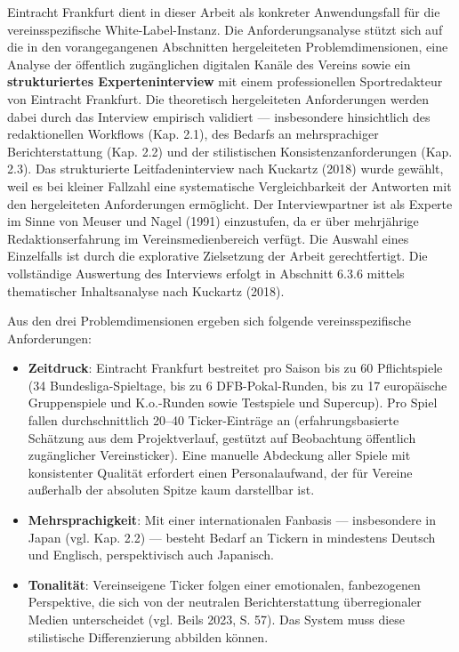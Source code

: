 Eintracht Frankfurt dient in dieser Arbeit als konkreter Anwendungsfall
für die vereinsspezifische White-Label-Instanz. Die Anforderungsanalyse
stützt sich auf die in den vorangegangenen Abschnitten hergeleiteten
Problemdimensionen, eine Analyse der öffentlich zugänglichen digitalen
Kanäle des Vereins sowie ein \textbf{strukturiertes Experteninterview}
mit einem professionellen Sportredakteur von Eintracht Frankfurt. Die
theoretisch hergeleiteten Anforderungen werden dabei durch das Interview
empirisch validiert --- insbesondere hinsichtlich des redaktionellen
Workflows (Kap. 2.1), des Bedarfs an mehrsprachiger Berichterstattung
(Kap. 2.2) und der stilistischen Konsistenzanforderungen (Kap. 2.3). Das
strukturierte Leitfadeninterview nach Kuckartz (2018) wurde gewählt,
weil es bei kleiner Fallzahl eine systematische Vergleichbarkeit der
Antworten mit den hergeleiteten Anforderungen ermöglicht. Der
Interviewpartner ist als Experte im Sinne von Meuser und Nagel (1991)
einzustufen, da er über mehrjährige Redaktionserfahrung im
Vereinsmedienbereich verfügt. Die Auswahl eines Einzelfalls ist durch
die explorative Zielsetzung der Arbeit gerechtfertigt. Die vollständige
Auswertung des Interviews erfolgt in Abschnitt 6.3.6 mittels
thematischer Inhaltsanalyse nach Kuckartz (2018).

Aus den drei Problemdimensionen ergeben sich folgende vereinsspezifische
Anforderungen:

\begin{itemize}
\tightlist
\item
  \textbf{Zeitdruck}: Eintracht Frankfurt bestreitet pro Saison bis zu
  60 Pflichtspiele (34 Bundesliga-Spieltage, bis zu 6 DFB-Pokal-Runden,
  bis zu 17 europäische Gruppenspiele und K.o.-Runden sowie Testspiele
  und Supercup). Pro Spiel fallen durchschnittlich 20--40
  Ticker-Einträge an (erfahrungsbasierte Schätzung aus dem
  Projektverlauf, gestützt auf Beobachtung öffentlich zugänglicher
  Vereinsticker). Eine manuelle Abdeckung aller Spiele mit konsistenter
  Qualität erfordert einen Personalaufwand, der für Vereine außerhalb
  der absoluten Spitze kaum darstellbar ist.
\item
  \textbf{Mehrsprachigkeit}: Mit einer internationalen Fanbasis ---
  insbesondere in Japan (vgl. Kap. 2.2) --- besteht Bedarf an Tickern in
  mindestens Deutsch und Englisch, perspektivisch auch Japanisch.
\item
  \textbf{Tonalität}: Vereinseigene Ticker folgen einer emotionalen,
  fanbezogenen Perspektive, die sich von der neutralen Berichterstattung
  überregionaler Medien unterscheidet (vgl. Beils 2023, S. 57). Das
  System muss diese stilistische Differenzierung abbilden können.
\end{itemize}

